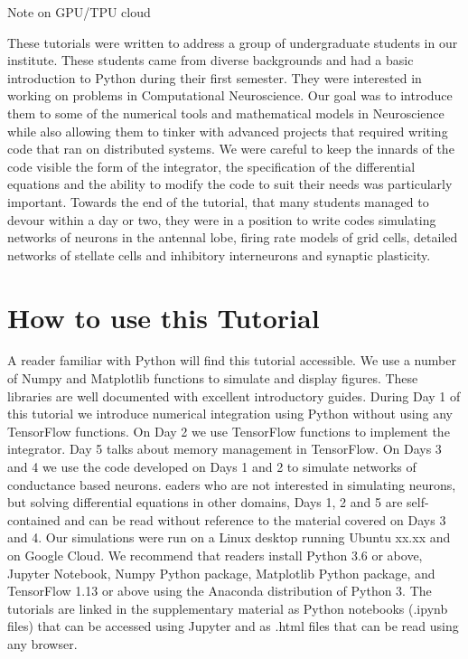 \documentclass[10pt,letterpaper]{article}
\begin{document}
Note on GPU/TPU cloud

These tutorials were written to address a group of undergraduate students in our institute. These students came from diverse backgrounds and had a basic introduction to Python during their first semester. They were interested in working on problems in Computational Neuroscience. Our goal was to introduce them to some of the numerical tools and mathematical models in Neuroscience while also allowing them to tinker with advanced projects that required writing code that ran on distributed systems. We were careful to keep the innards of the code visible \textemdash the form of the integrator, the specification of the differential equations and the ability to modify the code to suit their needs was particularly important. Towards the end of the tutorial, that many students managed to devour within a day or two, they were in a position to write codes simulating networks of neurons in the antennal lobe, firing rate models of grid cells, detailed networks of stellate cells and inhibitory interneurons and synaptic plasticity. 


\section*{How to use this Tutorial}
A reader familiar with Python will find this tutorial accessible. We use a number of Numpy and Matplotlib functions to simulate and display figures. These libraries are well documented with excellent introductory guides. During Day 1 of this tutorial we introduce numerical integration using Python without using any TensorFlow functions. On Day 2 we use TensorFlow functions to implement the integrator. Day 5 talks about memory management in TensorFlow. On Days 3 and 4 we use the code developed on Days 1 and 2 to simulate networks of conductance based neurons. eaders who are not interested in simulating neurons, but solving differential equations in other domains, Days 1, 2 and 5 are self-contained and can be read without reference to the material covered on Days 3 and 4. 
Our simulations were run on a Linux desktop running Ubuntu xx.xx and on Google Cloud. We recommend that readers install Python 3.6 or above, Jupyter Notebook, Numpy Python package, Matplotlib Python package, and TensorFlow 1.13 or above using the Anaconda distribution of Python 3. The tutorials are linked in the supplementary material as Python notebooks (.ipynb files) that can be accessed using Jupyter and as .html files that can be read using any browser.
\end{document}
